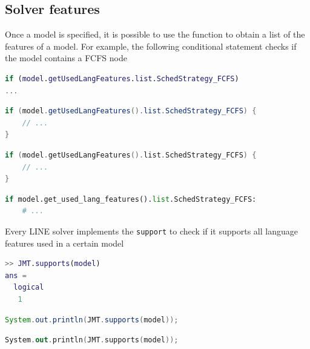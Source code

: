 \subsection{Solver features}
Once a model is specified, it is possible to use the  function to obtain a list of the features of a model. For example, the following conditional statement checks if the model contains a FCFS node
\begin{MATLAB}
\begin{lstlisting}[language = matlab]
if (model.getUsedLangFeatures.list.SchedStrategy_FCFS)
...
\end{lstlisting}
\end{MATLAB}
\begin{JAVA}
\begin{lstlisting}[language=java, basicstyle=\ttfamily\scriptsize]
if (model.getUsedLangFeatures().list.SchedStrategy_FCFS) {
    // ...
}
\end{lstlisting}
\end{JAVA}
\begin{KOTLIN}
\begin{lstlisting}[language=kotlin, basicstyle=\ttfamily\scriptsize]
if (model.getUsedLangFeatures().list.SchedStrategy_FCFS) {
    // ...
}
\end{lstlisting}
\end{KOTLIN}
\begin{PYTHON}
\begin{lstlisting}[language=python]
if model.get_used_lang_features().list.SchedStrategy_FCFS:
    # ...
\end{lstlisting}
\end{PYTHON}
Every \textsc{LINE} solver implements the \texttt{support} to check if it supports all language features used in a certain model
\begin{MATLAB}
\begin{lstlisting}[language = matlab]
>> JMT.supports(model)
ans =
  logical
   1
\end{lstlisting}
\end{MATLAB}
\begin{JAVA}
\begin{lstlisting}[language=java, basicstyle=\ttfamily\scriptsize]
System.out.println(JMT.supports(model));
\end{lstlisting}
\end{JAVA}
\begin{KOTLIN}
\begin{lstlisting}[language=kotlin, basicstyle=\ttfamily\scriptsize]
System.out.println(JMT.supports(model));
\end{lstlisting}
\end{KOTLIN}
